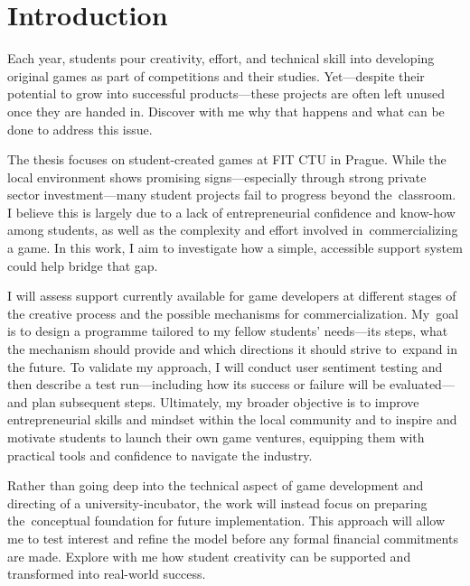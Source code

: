\chapter*{Introduction}
Each year, students pour creativity, effort, and technical skill into developing original games as part of competitions and their studies. Yet—despite their potential to grow into successful products—these projects are often left unused once they are handed in. Discover with me why that happens and what can be done to address this issue.

The thesis focuses on student-created games at FIT CTU in Prague. While the local environment shows promising signs—especially through strong private sector investment—many student projects fail to progress beyond the~classroom. I believe this is largely due to a lack of entrepreneurial confidence and know-how among students, as well as the complexity and effort involved in~commercializing a game. In this work, I aim to investigate how a simple, accessible support system could help bridge that gap.

I will assess support currently available for game developers at different stages of the creative process and the possible mechanisms for commercialization. My~goal is to design a programme tailored to my fellow students’ needs—its steps, what the mechanism should provide and which directions it should strive to~expand in the future. To validate my approach, I will conduct user sentiment testing and then describe a test run—including how its success or failure will be evaluated—and plan subsequent steps. Ultimately, my broader objective is to improve entrepreneurial skills and mindset within the local community and to inspire and motivate students to launch their own game ventures, equipping them with practical tools and confidence to navigate the industry.

Rather than going deep into the technical aspect of game development and directing of a university-incubator, the work will instead focus on preparing the~conceptual foundation for future implementation. This approach will allow me to test interest and refine the model before any formal financial commitments are made. Explore with me how student creativity can be supported and transformed into real-world success.
